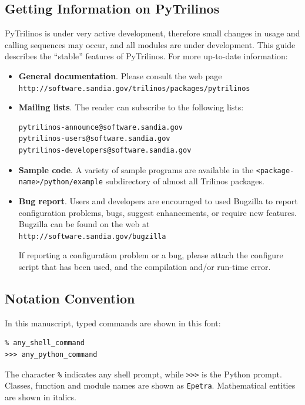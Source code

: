 \documentclass[10pt,relax]{SANDreport}
\newcommand{\PyTrilinos}{{PyTrilinos}}
\begin{document}
\subsection{Getting Information on \PyTrilinos}

PyTrilinos is under very active development, therefore small changes in usage
and calling sequences may occur, and all modules are under development. This
guide describes the ``stable'' features of PyTrilinos. For more up-to-date
information:
\begin{itemize}
\item {\bf General documentation}.
Please consult the web page \\
  \verb!http://software.sandia.gov/trilinos/packages/pytrilinos!
\item {\bf Mailing lists}. The reader can subscribe to the following lists:
\begin{verbatim}
pytrilinos-announce@software.sandia.gov
pytrilinos-users@software.sandia.gov
pytrilinos-developers@software.sandia.gov
\end{verbatim}
\item {\bf Sample code}. A variety of sample programs are available in the
\verb!<package-name>/python/example! subdirectory of almost all Trilinos
packages.
\item {\bf Bug report}.
Users and developers are encouraged to used Bugzilla to report
configuration problems, bugs, suggest enhancements, or require new features.
Bugzilla can be found on the web at\\
  \verb!http://software.sandia.gov/bugzilla!

If reporting a configuration problem or a bug, please attach the configure
script that has been used, and the compilation and/or run-time error.
\end{itemize}

\subsection{Notation Convention}

In this manuscript, typed commands are shown in this font:
\begin{verbatim}
% any_shell_command
>>> any_python_command
\end{verbatim}
The character \verb!%! indicates any shell prompt, while \verb!>>>! is the
Python prompt. Classes, function and module names are shown as \verb!Epetra!.
Mathematical entities are shown in italics.
\end{document}
